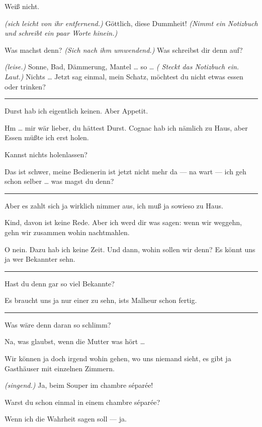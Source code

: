 \documentclass[
	final,
	a4paper,
	ngerman,
	mpinclude = true, %
	twoside = true,
	open = right,
	cleardoublepage = plain,
	DIV = 13,
	BCOR = 1cm,
	titlepage = firstiscover,
	]{scrbook}
\newcommand{\direction}[1]{\textit{(#1)}}
\newenvironment{deletion}{%
		\vspace{0.25\baselineskip}
		\hrule
		\vspace{0.25\baselineskip}
		\color{darkgray}
	}{
		\color{black}
		\vspace{0.25\baselineskip}
		\hrule 
		\vspace{0.25\baselineskip}
	}
\newcommand{\thecharacter}[1]{\textup{\textsc{#1}}\xspace}
\newcommand{\thesuesse}{\thecharacter{Süßes Mädel}}
\newcommand{\thedichter}{\thecharacter{Dichter}}
\newcommand{\character}[1]{\item[#1:]}
\newcommand{\suesse}{\character{\thesuesse}}
\newcommand{\dichter}{\character{\thedichter}}
\begin{document}
\begin{play}
	\suesse
	Weiß nicht.

	\dichter
	\direction{sich leicht von ihr entfernend.} Göttlich, diese Dummheit! \direction{Nimmt ein Notizbuch und schreibt ein paar Worte hinein.}

	\suesse
	Was machst denn? \direction{Sich nach ihm umwendend.} Was schreibst dir denn auf?

	\dichter
	\direction{leise.} Sonne, Bad, Dämmerung, Mantel \ldots{} so \ldots{} \direction{ Steckt das Notizbuch ein. Laut.} Nichts \ldots{} Jetzt sag einmal, mein Schatz, möchtest du nicht etwas essen oder trinken?

	\begin{deletion}
	\suesse
	Durst hab ich eigentlich keinen. Aber Appetit.

	\dichter
	Hm \ldots{} mir wär lieber, du hättest Durst. Cognac hab ich nämlich zu Haus, aber Essen müßte ich erst holen.

	\suesse
	Kannst nichts holenlassen?

	\dichter
	Das ist schwer, meine Bedienerin ist jetzt nicht mehr da --- na wart --- ich geh schon selber \ldots{} was magst du denn?
	\end{deletion}

	\suesse
	Aber es zahlt sich ja wirklich nimmer aus, ich muß ja sowieso zu Haus.

	\dichter
	Kind, davon ist keine Rede. Aber ich werd dir was sagen: wenn wir weggehn, gehn wir zusammen wohin nachtmahlen.

	\suesse
	O nein. Dazu hab ich keine Zeit. Und dann, wohin sollen wir denn? Es könnt uns ja wer Bekannter sehn.

	\begin{deletion}
	\dichter
	Hast du denn gar so viel Bekannte?

	\suesse
	Es braucht uns ja nur einer zu sehn, ists Malheur schon fertig.
	\end{deletion}

	\dichter
	Was wäre denn daran so schlimm?

	\suesse
	Na, was glaubst, wenn die Mutter was hört \ldots{}

	\dichter
	Wir können ja doch irgend wohin gehen, wo uns niemand sieht, es gibt ja Gasthäuser mit einzelnen Zimmern.

	\suesse
	\direction{singend.} Ja, beim Souper im chambre séparée!

	\dichter
	Warst du schon einmal in einem chambre séparée?

	\suesse
	Wenn ich die Wahrheit sagen soll --- ja.


\end{play}
\end{document}
